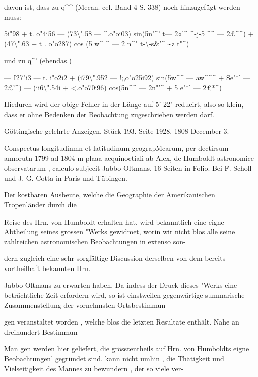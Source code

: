 \documentclass[10pt,a4paper]{article}
\begin{document}
davon ist, dass zu q\textasciicircum{}\textasciicircum{} (Mecan. cel. Band 4 S. 338) noch hinzugefügt werden muss:

5i"98 + t. o"4i56 — (73\textbackslash{}".58 — \textasciicircum{}.o"oi03) sin(5n'\textasciicircum{}' t— 2«'\textasciicircum{} \textasciicircum{}-j-5 \textasciicircum{}\textasciicircum{} — 2£\textasciicircum{}\textasciicircum{}) + (47\textbackslash{}".63 + t . o"o287) cos (5 w\textasciicircum{} \textasciicircum{} — 2 n\textasciicircum{}" t-\textbackslash{}-s\&'\textasciicircum{} \textasciitilde{}z t"\textasciicircum{})

und zu q\textasciicircum{}' (ebendas.)

— I27"i3 — t. i"o2i2 + (i79\textbackslash{}".952 — !;,o"o25i92) sin(5w\textasciicircum{}\textasciicircum{} — aw\textasciicircum{}\textasciicircum{}\textasciicircum{} + Se'*' — 2£'\textasciicircum{}) — (ii6\textbackslash{}".54i + <.o"o70i96) cos(5n\textasciicircum{}\textasciicircum{} — 2n"'\textasciicircum{} + 5 e'*' — 2£*\textasciicircum{})

Hiedurch wird der obige Fehler in der Länge auf 5' 22" reducirt, also so klein, dass er ohne Bedenken der Beobachtung zugeschrieben werden darf.

Göttingische gelehrte Anzeigen. Stück 193. Seite 1928. 1808 December 3.

Conspectus longitudinmn et latitudinum geograpMcarum, per dectirsum annorutn 1799 ad 1804 m plaaa aequinoctiali ab Alex, de Humboldt astronomice observatarum , calculo subjecit Jabbo Oltmans. 16 Seiten in Folio. Bei F. Scholl und J. G. Cotta in Paris und Tübingen.

Der kostbaren Ausbeute, welche die Geographie der Amerikanischen Tropenländer durch die

Reise des Hrn. von Humboldt erhalten hat, wird bekanntlich eine eigne Abtheilung seines grossen "Werks gewidmet, worin wir nicht blos alle seine zahlreichen astronomischen Beobachtungen in extenso son-

dern zugleich eine sehr sorgfältige Discussion derselben von dem bereits vortheilhaft bekannten Hrn.

Jabbo Oltmans zu erwarten haben. Da indess der Druck dieses "Werks eine beträchtliche Zeit erfordern wird, so ist einstweilen gegenwärtige summarische Zusammenstellung der vornehmsten Ortsbestimmun-

gen veranstaltet worden , welche blos die letzten Resultate enthält. Nahe an dreihundert Bestimmun-

Man gen werden hier geliefert, die grösstentheils auf Hrn. von Humboldts eigne Beobachtungen' gegründet sind. kann nicht umhin , die Thätigkeit und Vielseitigkeit des Mannes zu bewundern , der so viele ver-
\end{document}
